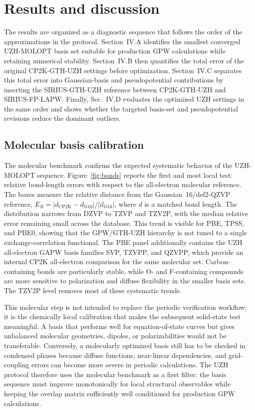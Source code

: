 \documentclass[aps,prb,reprint,amsmath,amssymb,superscriptaddress,longbibliography,floatfix]{revtex4-2}
\begin{document}
\section{Results and discussion}

The results are organized as a diagnostic sequence that follows the order of the approximations in the protocol. Section~IV.A identifies the smallest converged UZH-MOLOPT basis set suitable for production GPW calculations while retaining numerical stability. Section~IV.B then quantifies the total error of the original CP2K-GTH-UZH settings before optimization. Section~IV.C separates this total error into Gaussian-basis and pseudopotential contributions by inserting the SIRIUS-GTH-UZH reference between CP2K-GTH-UZH and SIRIUS-FP-LAPW. Finally, Sec.~IV.D evaluates the optimized UZH settings in the same order and shows whether the targeted basis-set and pseudopotential revisions reduce the dominant outliers.

\subsection{Molecular basis calibration}

The molecular benchmark confirms the expected systematic behavior of the UZH-MOLOPT sequence. Figure~\ref{fig:bonds} reports the first and most local test: relative bond-length errors with respect to the all-electron molecular reference. The boxes measure the relative distance from the Gaussian~16/def2-QZVP reference, $E_R=|d_{\mathrm{CP2K}}-d_{\mathrm{G16}}|/|d_{\mathrm{G16}}|$, where $d$ is a matched bond length. The distribution narrows from DZVP to TZVP and TZV2P, with the median relative error remaining small across the database. This trend is visible for PBE, TPSS, and PBE0, showing that the GPW/GTH-UZH hierarchy is not tuned to a single exchange-correlation functional. The PBE panel additionally contains the UZH all-electron GAPW basis families SVP, TZVPP, and QZVPP, which provide an internal CP2K all-electron comparison for the same molecular set. Carbon-containing bonds are particularly stable, while O- and F-containing compounds are more sensitive to polarization and diffuse flexibility in the smaller basis sets. The TZV2P level removes most of these systematic trends.

This molecular step is not intended to replace the periodic verification workflow; it is the chemically local calibration that makes the subsequent solid-state test meaningful. A basis that performs well for equation-of-state curves but gives unbalanced molecular geometries, dipoles, or polarizabilities would not be transferable. Conversely, a molecularly optimized basis still has to be checked in condensed phases because diffuse functions, near-linear dependencies, and grid-coupling errors can become more severe in periodic calculations. The UZH protocol therefore uses the molecular benchmark as a first filter: the basis sequence must improve monotonically for local structural observables while keeping the overlap matrix sufficiently well conditioned for production GPW calculations.
\end{document}
